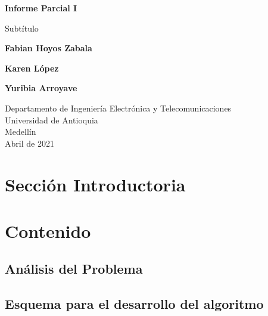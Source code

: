 \documentclass{article}
\begin{document}
\begin{titlepage}
    \begin{center}
        \vspace*{1cm}
            
        \Huge
        \textbf{Informe Parcial I}
            
        \vspace{0.5cm}
        \LARGE
        Subtítulo
            
        \vspace{1.5cm}
            
        \textbf{Fabian Hoyos Zabala}
        
        \vspace{1.5cm}
        
        \textbf{Karen López}
        
        \vspace{1.5cm}
        
        \textbf{Yuribia Arroyave}
            
        \vfill
            
        \vspace{0.8cm}
            
        \Large
        Departamento de Ingeniería Electrónica y Telecomunicaciones\\
        Universidad de Antioquia\\
        Medellín\\
       Abril de 2021
            
    \end{center}
\end{titlepage}

\tableofcontents
\newpage
\section{Sección Introductoria}\label{intro}

\section{Contenido} \label{contenido}

\subsection{Análisis del Problema}

\subsection{Esquema para el desarrollo del algoritmo}
\end{document}
